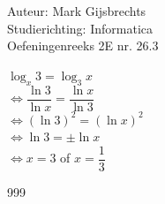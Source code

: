 \documentclass[a4paper]{article}
\begin{document}
\noindent \large Auteur: Mark Gijsbrechts \\
\noindent \large Studierichting: Informatica\\
\noindent \large Oefeningenreeks 2E nr. 26.3\\

\medskip

\normalsize





$\log_x 3 = \log_3 x $ \\

$ \Leftrightarrow \dfrac{\ln 3}{\ln x} = \dfrac{\ln x}{\ln 3} $ \\

$ \Leftrightarrow (\ln 3)^2 = (\ln x)^2 $ \\

$ \Leftrightarrow \ln 3 = \pm \ln x $ \\

$ \Leftrightarrow x = 3 $ of $ x = \dfrac{1}{3} $


\begin{thebibliography}{999}
\end{thebibliography}
\end{document}
